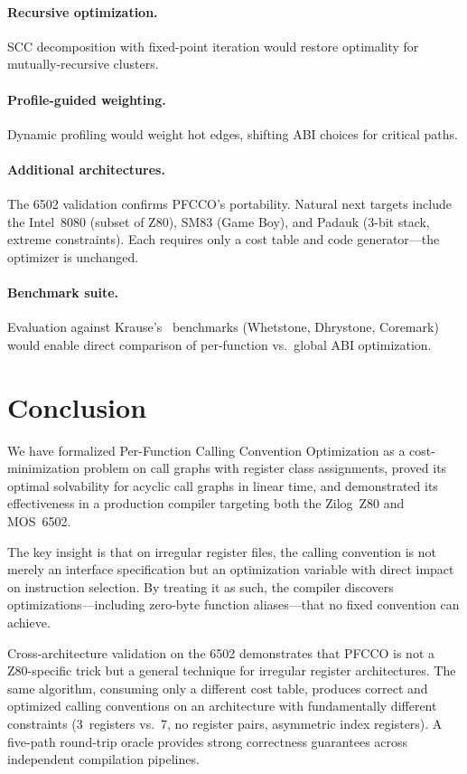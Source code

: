 \documentclass[sigplan,screen,nonacm]{acmart}
\begin{document}
\paragraph{Recursive optimization.}
SCC decomposition with fixed-point iteration would restore optimality for
mutually-recursive clusters.

\paragraph{Profile-guided weighting.}
Dynamic profiling would weight hot edges, shifting ABI choices for critical
paths.

\paragraph{Additional architectures.}
The 6502 validation confirms PFCCO's portability.  Natural next targets
include the Intel~8080 (subset of Z80), SM83 (Game Boy), and Padauk (3-bit
stack, extreme constraints).  Each requires only a cost table and code
generator---the optimizer is unchanged.

\paragraph{Benchmark suite.}
Evaluation against Krause's~\cite{krause2022} benchmarks (Whetstone,
Dhrystone, Coremark) would enable direct comparison of per-function vs.\
global ABI optimization.

\section{Conclusion}
\label{sec:conclusion}

We have formalized Per-Function Calling Convention Optimization as a
cost-minimization problem on call graphs with register class assignments,
proved its optimal solvability for acyclic call graphs in linear time, and
demonstrated its effectiveness in a production compiler targeting both the
Zilog~Z80 and MOS~6502.

The key insight is that on irregular register files, the calling convention
is not merely an interface specification but an optimization variable with
direct impact on instruction selection.  By treating it as such, the
compiler discovers optimizations---including zero-byte function
aliases---that no fixed convention can achieve.

Cross-architecture validation on the 6502 demonstrates that PFCCO is not a
Z80-specific trick but a general technique for irregular register
architectures.  The same algorithm, consuming only a different cost table,
produces correct and optimized calling conventions on an architecture with
fundamentally different constraints (3~registers vs.\ 7, no register pairs,
asymmetric index registers).  A five-path round-trip oracle provides strong
correctness guarantees across independent compilation pipelines.
\end{document}
